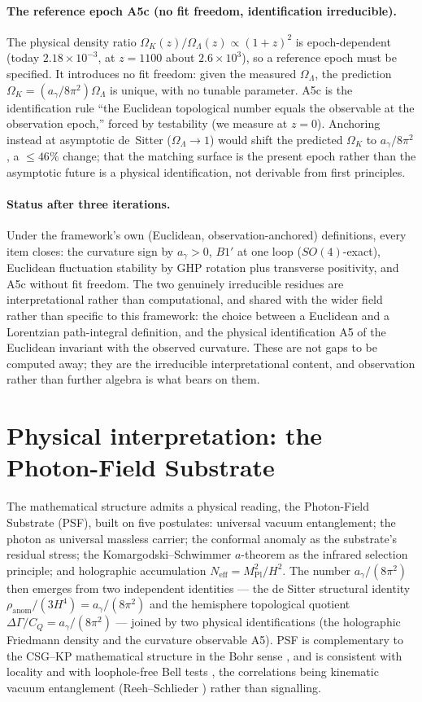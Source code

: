 \documentclass[11pt,a4paper]{article}
\theoremstyle{plain}
\theoremstyle{definition}
\theoremstyle{remark}
\newcommand{\Ok}{\Omega_K}
\newcommand{\OL}{\Omega_\Lambda}
\newcommand{\ag}{a_\gamma}
\newcommand{\CQ}{C_Q}
\newcommand{\Mpl}{M_{\mathrm{Pl}}}
\begin{document}
\paragraph{The reference epoch A5c (no fit freedom, identification irreducible).} The physical
density ratio $\Ok(z)/\OL(z) \propto (1+z)^2$ is epoch-dependent (today $2.18\times10^{-3}$, at
$z=1100$ about $2.6\times10^3$), so a reference epoch must be specified. It introduces no fit
freedom: given the measured $\OL$, the prediction $\Ok = (\ag/8\pi^2)\OL$ is unique, with no
tunable parameter. A5c is the identification rule ``the Euclidean topological number equals the
observable at the observation epoch,'' forced by testability (we measure at $z=0$). Anchoring
instead at asymptotic de~Sitter ($\OL\to1$) would shift the predicted $\Ok$ to $\ag/8\pi^2$, a
$\le46\%$ change; that the matching surface is the present epoch rather than the asymptotic future
is a physical identification, not derivable from first principles.

\paragraph{Status after three iterations.} Under the framework's own (Euclidean,
observation-anchored) definitions, every item closes: the curvature sign by $\ag>0$, $B1'$ at one
loop ($SO(4)$-exact), Euclidean fluctuation stability by GHP rotation plus transverse positivity,
and A5c without fit freedom. The two genuinely irreducible residues are interpretational rather
than computational, and shared with the wider field rather than specific to this framework: the
choice between a Euclidean and a Lorentzian path-integral definition, and the physical
identification A5 of the Euclidean invariant with the observed curvature. These are not gaps to be
computed away; they are the irreducible interpretational content, and observation rather than
further algebra is what bears on them.

\section{Physical interpretation: the Photon-Field Substrate}
\label{sec:psf}

The mathematical structure admits a physical reading, the Photon-Field Substrate (PSF), built
on five postulates: universal vacuum entanglement; the photon as universal massless carrier;
the conformal anomaly as the substrate's residual stress; the Komargodski--Schwimmer $a$-theorem
as the infrared selection principle; and holographic accumulation $N_{\mathrm{eff}} =
\Mpl^2/H^2$. The number $\ag/(8\pi^2)$ then emerges from two independent identities --- the de
Sitter structural identity $\rho_{\mathrm{anom}}/(3H^4) = \ag/(8\pi^2)$ and the hemisphere
topological quotient $\Delta\Gamma/\CQ = \ag/(8\pi^2)$ --- joined by two physical
identifications (the holographic Friedmann density and the curvature observable A5). PSF is
complementary to the CSG--KP mathematical structure in the Bohr sense \cite{Bohr1928}, and is
consistent with locality and with loophole-free Bell tests
\cite{Hensen2015,Giustina2015,Shalm2015}, the correlations being kinematic vacuum entanglement
(Reeh--Schlieder \cite{ReehSchlieder1961}) rather than signalling.
\end{document}

